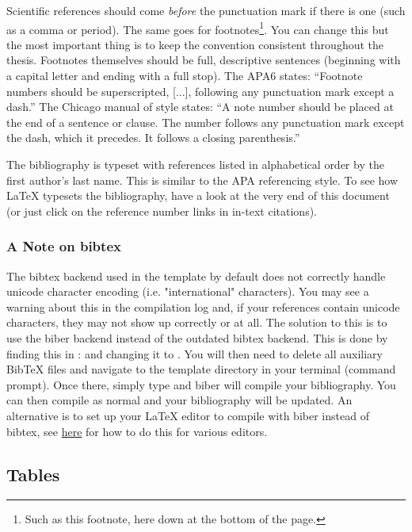 \documentclass[
12pt, %
english, %
doublespacing, %
nolistspacing, %
liststotoc, %
headsepline, %
chapterinoneline, %
openany, %
]{DoctoralThesis}\usepackage[]{graphicx}\usepackage[]{color}
\begin{document}
Scientific references should come \emph{before} the punctuation mark if there is one (such as a comma or period). The same goes for footnotes\footnote{Such as this footnote, here down at the bottom of the page.}. You can change this but the most important thing is to keep the convention consistent throughout the thesis. Footnotes themselves should be full, descriptive sentences (beginning with a capital letter and ending with a full stop). The APA6 states: \enquote{Footnote numbers should be superscripted, [...], following any punctuation mark except a dash.} The Chicago manual of style states: \enquote{A note number should be placed at the end of a sentence or clause. The number follows any punctuation mark except the dash, which it precedes. It follows a closing parenthesis.}

The bibliography is typeset with references listed in alphabetical order by the first author's last name. This is similar to the APA referencing style. To see how \LaTeX{} typesets the bibliography, have a look at the very end of this document (or just click on the reference number links in in-text citations).

\subsubsection{A Note on bibtex}

The bibtex backend used in the template by default does not correctly handle unicode character encoding (i.e. "international" characters). You may see a warning about this in the compilation log and, if your references contain unicode characters, they may not show up correctly or at all. The solution to this is to use the biber backend instead of the outdated bibtex backend. This is done by finding this in :  and changing it to . You will then need to delete all auxiliary BibTeX files and navigate to the template directory in your terminal (command prompt). Once there, simply type  and biber will compile your bibliography. You can then compile  as normal and your bibliography will be updated. An alternative is to set up your LaTeX editor to compile with biber instead of bibtex, see \href{http://tex.stackexchange.com/questions/154751/biblatex-with-biber-configuring-my-editor-to-avoid-undefined-citations/}{here} for how to do this for various editors.

\subsection{Tables}
\end{document}
